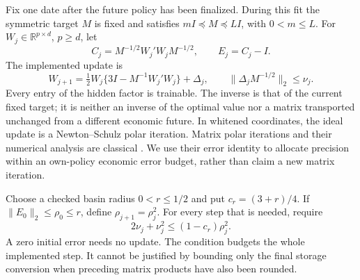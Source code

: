 \documentclass[ecta,nameyear,draft]{econsocart}
\theoremstyle{definition}
\theoremstyle{remark}
\newcommand{\R}{\mathbb R}
\begin{document}
Fix one date after the future policy has been finalized. During this fit the
symmetric target $M$ is fixed and satisfies $mI\preceq M\preceq LI$, with
$0<m\leq L$. For $W_j\in\R^{p\times d}$, $p\geq d$, let
\[
 C_j=M^{-1/2}W_j'W_jM^{-1/2},\qquad E_j=C_j-I.
\]
The implemented update is
\begin{equation}\label{eq:r37update}
 W_{j+1}=\tfrac12 W_j\{3I-M^{-1}W_j'W_j\}+\Delta_j,
 \qquad \|\Delta_jM^{-1/2}\|_2\leq\nu_j.
\end{equation}
Every entry of the hidden factor is trainable. The inverse is that of the
current fixed target; it is neither an inverse of the optimal value nor a
matrix transported unchanged from a different economic future. In whitened
coordinates, the ideal update is a Newton--Schulz polar iteration. Matrix
polar iterations and their numerical analysis are classical
\citep{r37higham2008}. We use their error identity to allocate precision within
an own-policy economic error budget, rather than claim a new matrix iteration.

Choose a checked basin radius $0<r\leq1/2$ and put $c_r=(3+r)/4$. If
$\|E_0\|_2\leq\rho_0\leq r$, define $\rho_{j+1}=\rho_j^2$. For every
step that is needed, require
\begin{equation}\label{eq:r37precision}
 2\nu_j+\nu_j^2\leq(1-c_r)\rho_j^2.
\end{equation}
A zero initial error needs no update. The condition budgets the whole
implemented step. It cannot be justified by bounding only the final storage
conversion when preceding matrix products have also been rounded.
\end{document}

